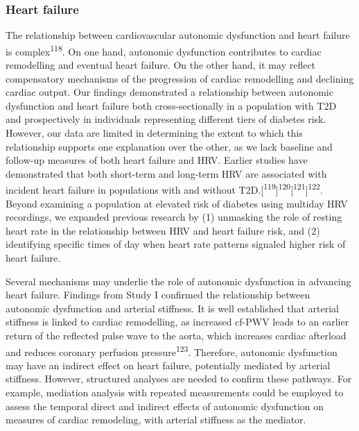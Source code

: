 \documentclass[
  letterpaper,
  headsepline=true,
  open=any]{scrbook}
\begin{document}
\hypertarget{heart-failure-1}{%
\subsubsection{Heart failure}\label{heart-failure-1}}

The relationship between cardiovascular autonomic dysfunction and heart
failure is complex\textsuperscript{118}. On one hand, autonomic
dysfunction contributes to cardiac remodelling and eventual heart
failure. On the other hand, it may reflect compensatory mechanisms of
the progression of cardiac remodelling and declining cardiac output. Our
findings demonstrated a relationship between autonomic dysfunction and
heart failure both cross-sectionally in a population with T2D and
prospectively in individuals representing different tiers of diabetes
risk. However, our data are limited in determining the extent to which
this relationship supports one explanation over the other, as we lack
baseline and follow-up measures of both heart failure and HRV. Earlier
studies have demonstrated that both short-term and long-term HRV are
associated with incident heart failure in populations with and without
T2D.{[}\textsuperscript{119}{]}\textsuperscript{120}{[}\textsuperscript{121}{]}\textsuperscript{122}.
Beyond examining a population at elevated risk of diabetes using
multiday HRV recordings, we expanded previous research by (1) unmasking
the role of resting heart rate in the relationship between HRV and heart
failure risk, and (2) identifying specific times of day when heart rate
patterns signaled higher risk of heart failure.

Several mechanisms may underlie the role of autonomic dysfunction in
advancing heart failure. Findings from Study I confirmed the
relationship between autonomic dysfunction and arterial stiffness. It is
well established that arterial stiffness is linked to cardiac
remodelling, as increased cf-PWV leads to an earlier return of the
reflected pulse wave to the aorta, which increases cardiac afterload and
reduces coronary perfusion pressure\textsuperscript{123}. Therefore,
autonomic dysfunction may have an indirect effect on heart failure,
potentially mediated by arterial stiffness. However, structured analyses
are needed to confirm these pathways. For example, mediation analysis
with repeated measurements could be employed to assess the temporal
direct and indirect effects of autonomic dysfunction on measures of
cardiac remodeling, with arterial stiffness as the mediator.
\end{document}
